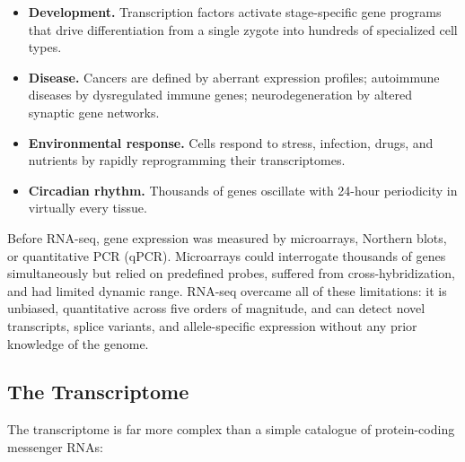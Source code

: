 \begin{itemize}[nosep]
  \item \textbf{Development.} Transcription factors activate stage-specific
    gene programs that drive differentiation from a single zygote into hundreds
    of specialized cell types.
  \item \textbf{Disease.} Cancers are defined by aberrant expression profiles;
    autoimmune diseases by dysregulated immune genes; neurodegeneration by
    altered synaptic gene networks.
  \item \textbf{Environmental response.} Cells respond to stress, infection,
    drugs, and nutrients by rapidly reprogramming their transcriptomes.
  \item \textbf{Circadian rhythm.} Thousands of genes oscillate with 24-hour
    periodicity in virtually every tissue.
\end{itemize}

Before \acrshort{RNA-seq}, gene expression was measured by microarrays,
Northern blots, or quantitative PCR (qPCR). Microarrays could interrogate
thousands of genes simultaneously but relied on predefined probes, suffered
from cross-hybridization, and had limited dynamic range. \acrshort{RNA-seq}
overcame all of these limitations: it is unbiased, quantitative across
five orders of magnitude, and can detect novel transcripts, splice variants,
and allele-specific expression without any prior knowledge of the genome.

\subsection{The Transcriptome}

The transcriptome is far more complex than a simple catalogue of protein-coding
messenger RNAs:

